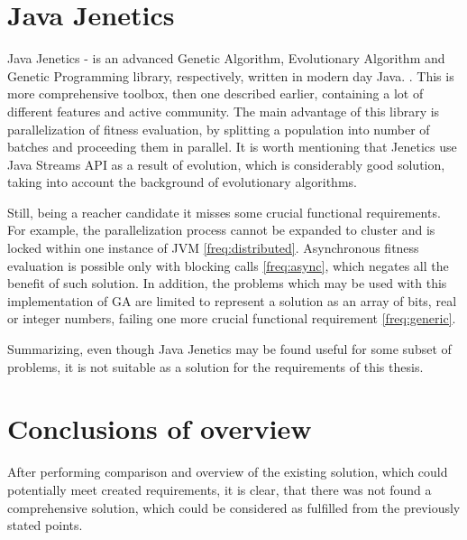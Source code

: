 \section{Java Jenetics}

Java Jenetics - is an advanced Genetic Algorithm, Evolutionary Algorithm and Genetic Programming library, respectively, written in modern day Java. \cite{jenetics_manual}. This is more comprehensive toolbox, then one described earlier, containing a lot of different features and active community. The main advantage of this library is parallelization of fitness evaluation, by splitting a population into number of batches and proceeding them in parallel. It is worth mentioning that Jenetics use Java Streams API as a result of evolution, which is considerably good solution, taking into account the background of evolutionary algorithms. 

Still, being a reacher candidate it misses some crucial functional requirements. For example, the parallelization process cannot be expanded to cluster and is locked within one instance of JVM \ref{freq:distributed}. Asynchronous fitness evaluation is possible only with blocking calls \ref{freq:async}, which negates all the benefit of such solution. In addition, the problems which may be used with this implementation of GA are limited to represent a solution as an array of bits, real or integer numbers, failing one more crucial functional requirement \ref{freq:generic}.

Summarizing, even though Java Jenetics may be found useful for some subset of problems, it is not suitable as a solution for the requirements of this thesis.
\section{Conclusions of overview}

After performing comparison and overview of the existing solution, which could potentially meet created requirements, it is clear, that there was not found a comprehensive solution, which could be considered as fulfilled from the previously stated points.

